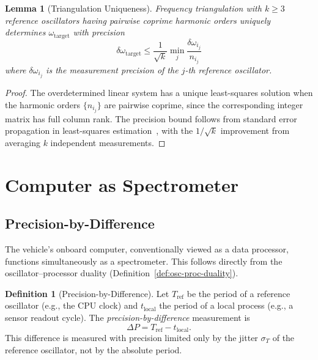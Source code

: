 \documentclass[twocolumn,10pt]{article}
\newtheorem{lemma}[theorem]{Lemma}
\theoremstyle{definition}
\newtheorem{definition}[theorem]{Definition}
\theoremstyle{remark}
\begin{document}
\begin{lemma}[Triangulation Uniqueness]\label{lem:triangulation-unique}
Frequency triangulation with $k \geq 3$ reference oscillators having
pairwise coprime harmonic orders uniquely determines
$\omega_{\mathrm{target}}$ with precision
\begin{equation}\label{eq:triangulation-precision}
  \delta\omega_{\mathrm{target}} \leq \frac{1}{\sqrt{k}}
  \min_{j} \frac{\delta\omega_{i_j}}{n_{i_j}}
\end{equation}
where $\delta\omega_{i_j}$ is the measurement precision of the $j$-th
reference oscillator.
\end{lemma}

\begin{proof}
The overdetermined linear system has a unique least-squares solution when
the harmonic orders $\{n_{i_j}\}$ are pairwise coprime, since the
corresponding integer matrix has full column rank. The precision bound
follows from standard error propagation in least-squares
estimation~\cite{cover2006}, with the $1/\sqrt{k}$ improvement from
averaging $k$ independent measurements.
\end{proof}


\section{Computer as Spectrometer}\label{sec:spectrometer}

\subsection{Precision-by-Difference}

The vehicle's onboard computer, conventionally viewed as a data processor,
functions simultaneously as a spectrometer. This follows directly from the
oscillator--processor duality (Definition~\ref{def:osc-proc-duality}).

\begin{definition}[Precision-by-Difference]\label{def:precision-by-diff}
Let $T_{\mathrm{ref}}$ be the period of a reference oscillator (e.g., the CPU
clock) and $t_{\mathrm{local}}$ the period of a local process (e.g., a sensor
readout cycle). The \emph{precision-by-difference} measurement is
\begin{equation}\label{eq:precision-diff}
  \Delta P = T_{\mathrm{ref}} - t_{\mathrm{local}}.
\end{equation}
This difference is measured with precision limited only by the jitter
$\sigma_T$ of the reference oscillator, not by the absolute period.
\end{definition}
\end{document}

